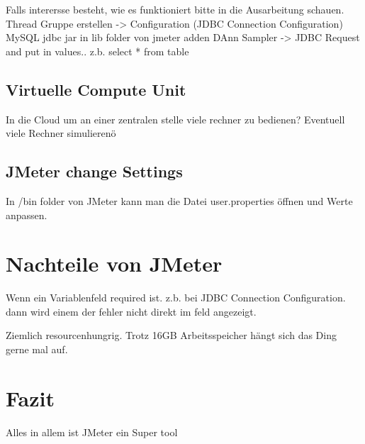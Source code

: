 \documentclass[a4paper,12pt]{article}
\begin{document}
Falls interersse besteht, wie es funktioniert bitte in die Ausarbeitung schauen.
Thread Gruppe erstellen -> Configuration (JDBC Connection Configuration)
MySQL jdbc jar in lib folder von jmeter adden 
DAnn Sampler -> JDBC Request and put in values.. z.b. select * from table


\subsection{Virtuelle Compute Unit}
In die Cloud um an einer zentralen stelle viele rechner zu bedienen?
Eventuell viele Rechner simulierenö

\subsection{JMeter change Settings}
In /bin folder von JMeter kann man die Datei user.properties öffnen und Werte anpassen.

\section{Nachteile von JMeter}
Wenn ein Variablenfeld required ist. z.b. bei JDBC Connection Configuration. dann wird einem der fehler nicht direkt im feld angezeigt.

Ziemlich resourcenhungrig. Trotz 16GB Arbeitsspeicher hängt sich das Ding gerne mal auf.
\section{Fazit}
Alles in allem ist JMeter ein Super tool

\pagebreak


\end{document}
